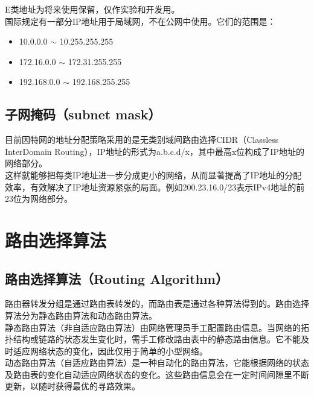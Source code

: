 E类地址为将来使用保留，仅作实验和开发用。\\

国际规定有一部分IP地址用于局域网，不在公网中使用。它们的范围是：

\begin{itemize}
    \item 10.0.0.0 $ \sim $ 10.255.255.255
    \item 172.16.0.0 $ \sim $ 172.31.255.255
    \item 192.168.0.0 $ \sim $ 192.168.255.255
\end{itemize}

\vspace{0.5cm}

\subsection{子网掩码（subnet mask）}

目前因特网的地址分配策略采用的是无类别域间路由选择CIDR（Classless InterDomain Routing），IP地址的形式为a.b.c.d/x，其中最高x位构成了IP地址的网络部分。\\

这样就能够把每类IP地址进一步分成更小的网络，从而显著提高了IP地址的分配效率，有效解决了IP地址资源紧张的局面。例如200.23.16.0/23表示IPv4地址的前23位为网络部分。

\newpage

\section{路由选择算法}

\subsection{路由选择算法（Routing Algorithm）}

路由器转发分组是通过路由表转发的，而路由表是通过各种算法得到的。路由选择算法分为静态路由算法和动态路由算法。\\

静态路由算法（非自适应路由算法）由网络管理员手工配置路由信息。当网络的拓扑结构或链路的状态发生变化时，需手工修改路由表中的静态路由信息。它不能及时适应网络状态的变化，因此仅用于简单的小型网络。\\

动态路由算法（自适应路由算法）是一种自动化的路由算法，它能根据网络的状态及路由表的变化自动适应网络状态的变化。这些路由信息会在一定时间间隙里不断更新，以随时获得最优的寻路效果。\\

